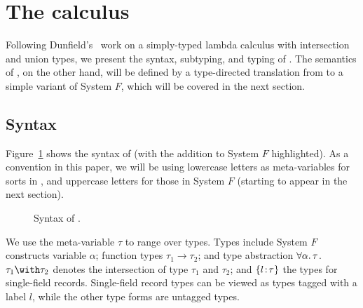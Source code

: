 \section{The \name calculus}

Following Dunfield's~\cite{dunfield2014elaborating} work on a simply-typed
lambda calculus with intersection and union types, we present the syntax,
subtyping, and typing of \name. The semantics of \name, on the other hand, will
be defined by a type-directed translation from \name to a simple variant of
System $F$, which will be covered in the next section.

\subsection{Syntax}

Figure~\ref{fig:fi-syntax} shows the syntax of \name (with the addition to
System $F$ highlighted). As a convention in this paper, we will be using
lowercase letters as meta-variables for sorts in \name, and uppercase letters
for those in System $F$ (starting to appear in the next section).


\begin{figure}[h]
  
  \caption{Syntax of \name.}
  \label{fig:fi-syntax}
\end{figure}

We use the meta-variable $\tau$ to range over types. Types include System $F$
constructs variable $ \alpha $; function types $ \tau_1 \to \tau_2 $; and type
abstraction $ \forall \alpha. \, \tau $. $ \tau_1 \andop \tau_2 $ denotes the
intersection of type $ \tau_1 $ and $ \tau_2 $; and $ \{ l \!:\! \tau \} $ the types
for single-field records. Single-field record types can be viewed as types
tagged with a label $l$, while the other type forms are untagged types.

